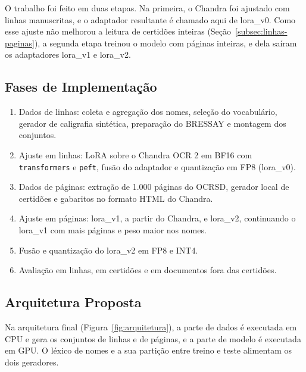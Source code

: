 \documentclass[12pt,a4paper]{article}
\begin{document}
O trabalho foi feito em duas etapas. Na primeira, o Chandra foi ajustado com linhas manuscritas, e o adaptador resultante é chamado aqui de lora\_v0. Como esse ajuste não melhorou a leitura de certidões inteiras (Seção~\ref{subsec:linhas-paginas}), a segunda etapa treinou o modelo com páginas inteiras, e dela saíram os adaptadores lora\_v1 e lora\_v2.

\subsection{Fases de Implementação}
\begin{enumerate}
    \item Dados de linhas: coleta e agregação dos nomes, seleção do vocabulário, gerador de caligrafia sintética, preparação do BRESSAY e montagem dos conjuntos.
    \item Ajuste em linhas: LoRA sobre o Chandra OCR 2 em BF16 com \texttt{transformers} e \texttt{peft}, fusão do adaptador e quantização em FP8 (lora\_v0).
    \item Dados de páginas: extração de 1.000 páginas do OCRSD, gerador local de certidões e gabaritos no formato HTML do Chandra.
    \item Ajuste em páginas: lora\_v1, a partir do Chandra, e lora\_v2, continuando o lora\_v1 com mais páginas e peso maior nos nomes.
    \item Fusão e quantização do lora\_v2 em FP8 e INT4.
    \item Avaliação em linhas, em certidões e em documentos fora das certidões.
\end{enumerate}

\subsection{Arquitetura Proposta}
\label{subsec:arquitetura}

Na arquitetura final (Figura~\ref{fig:arquitetura}), a parte de dados é executada em CPU e gera os conjuntos de linhas e de páginas, e a parte de modelo é executada em GPU. O léxico de nomes e a sua partição entre treino e teste alimentam os dois geradores.
\end{document}
